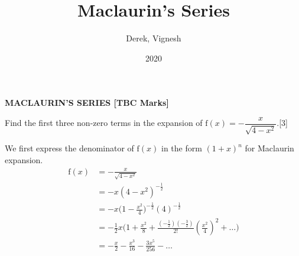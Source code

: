 \documentclass[12pt, a4 paper]{article}
\title{Maclaurin's Series}
\author{Derek, Vignesh}
\date{2020}
\begin{document}
\maketitle

\textbf{MACLAURIN'S SERIES [TBC Marks]}
\begin{outline}[enumerate]
  \1 Find the first three non-zero terms in the expansion of \(\textrm{f}(x)=-\dfrac{x}{\sqrt{4-x^2}}\).\hfill[3] %
  \begin{answer}
  We first express the denominator of $\textrm{f}(x)$ in the form $(1+x)^n$ for Maclaurin expansion.
    \begin{align*}
      \textrm{f}(x)&=-\frac{x}{\sqrt{4-x^2}} \\
      &= -x(4-x^2)^{-\frac{1}{2}} \\
      &= -x\Big(1-\frac{x^2}{4}\Big)^{-\frac{1}{2}}(4)^{-\frac{1}{2}} \\
      &= -\frac{1}{2}x\Big(1+\frac{x^2}{8}+\frac{\left(-\frac{1}{2}\right)\left(-\frac{3}{2}\right)}{2!}\left(\frac{x^2}{4}\right)^2+\dots\Big) \\
      &= -\frac{x}{2} - \frac{x^3}{16} - \frac{3x^5}{256} - \dots
    \end{align*}
  \end{answer}


\end{outline}
\end{document}
